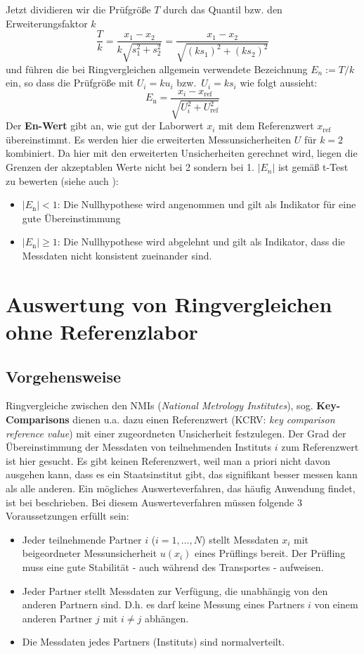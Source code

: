 Jetzt dividieren wir die Prüfgröße $T$ durch das Quantil bzw. den Erweiterungsfaktor $k$
$$
\frac{T}{k} = \frac{x_1 - x_2}{k \sqrt{s_1^2 + s_2^2}}  = \frac{x_1 - x_2}
{\sqrt{(k s_1)^2 + (k s_2)^2}} 
$$
und führen die bei Ringvergleichen allgemein verwendete Bezeichnung $E_n := T /k$ ein,
so dass die Prüfgröße mit $U_i = k u_i$ bzw.\  $U_i = k s_i$ wie folgt aussieht:
\begin{equation}
E_\mathrm{n} = \frac{x_{i}- x_\mathrm{ref}}{\sqrt{U_{i}^2+U_\mathrm{ref}^2}}
\label{eq:EnWert}
\end{equation}
Der \textbf{En-Wert} gibt an, wie gut der Laborwert $x_{i}$ mit dem 
Referenzwert $x_\mathrm{ref}$ übereinstimmt. Es werden hier die erweiterten Messunsicherheiten $U$ für $k=2$ kombiniert.
Da hier mit den erweiterten Unsicherheiten gerechnet wird, liegen die Grenzen der akzeptablen Werte nicht bei 2 sondern bei 1.
$|E_n|$ ist gemäß t-Test zu bewerten (siehe auch \cite{ISO13528}):
\begin{itemize}
	\item $|E_\mathrm{n}| < 1$: Die Nullhypothese wird angenommen und gilt als Indikator für eine gute Übereinstimmung
	\item $|E_\mathrm{n}| \ge 1$: Die Nullhypothese wird abgelehnt und gilt als Indikator, dass die Messdaten nicht konsistent zueinander sind.
\end{itemize} 

\section{Auswertung von Ringvergleichen ohne Referenzlabor}
\subsection{Vorgehensweise}
Ringvergleiche zwischen den NMIs (\textsl{National Metrology Institutes}), sog. 
\textbf{Key-Com\-pari\-sons} dienen u.a. dazu einen Referenzwert (KCRV: \textsl{key comparison reference
value}) mit einer zugeordneten Unsicherheit festzulegen.
Der Grad der Übereinstimmung der Messdaten von teilnehmenden Instituts $i$ zum Referenzwert ist hier gesucht. Es gibt keinen Referenzwert, weil man a priori nicht davon ausgehen kann, dass es ein Staatsinstitut gibt, das signifikant besser messen kann als alle anderen.
Ein mögliches Auswerteverfahren, das häufig Anwendung findet, ist bei 
\cite{Cox02} beschrieben. Bei diesem Auswerteverfahren müssen 
folgende 3 Voraussetzungen erfüllt sein: 
\begin{itemize}
	\item Jeder teilnehmende Partner $i$ ($i=1, \dots, N$) stellt Messdaten $x_i$ mit 
	beigeordneter Messunsicherheit $u(x_i)$ eines Prüflings bereit. Der 
	Prüfling muss eine gute Stabilität - auch während des Transportes -
	aufweisen. 
	\item Jeder Partner stellt Messdaten zur Verfügung, die 
	unabhängig von den anderen Partnern sind. D.h. es darf keine 
	Messung eines Partners $i$ von einem anderen Partner $j$ mit $i \ne j$ abhängen. 
	\item Die Messdaten jedes Partners (Instituts) sind normalverteilt.
\end{itemize}

